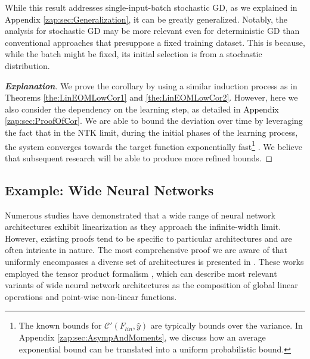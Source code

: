 \documentclass{article} %
\begin{document}
While this result addresses single-input-batch stochastic GD, as we explained in \textcolor{black}{Appendix} \ref{zap:sec:Generalization}, \textcolor{black}{it} can be greatly generalized. Notably, the analysis for stochastic GD may be more relevant even for deterministic GD than conventional approaches that presuppose a fixed training dataset. This is because, while the batch might be fixed, its initial selection is from a stochastic distribution. 

\begin{proof}[\textbf{Explanation}]
We prove the corollary by using a similar induction process as in \textcolor{black}{Theorems} \ref{the:LinEOMLowCor1}\textcolor{black}{ and} \ref{the:LinEOMLowCor2}. However, here we also consider the dependency \textcolor{black}{on} the learning step, as detailed in \textcolor{black}{Appendix} \ref{zap:sec:ProofOfCor}. We are able to bound the deviation over time by leveraging the fact that in the NTK limit, during the initial phases of the learning process, the system converges towards the target function exponentially fast\footnote{The known bounds for \(\mathcal{C}'\left(F_{lin},\hat{y}\right)\) are typically bounds over the variance. In Appendix \ref{zap:sec:AsympAndMoments}, we discuss how an average exponential bound can be translated into a uniform probabilistic bound.} \cite{ConvergenceOverparameterization2019,WideNNEvLinGD2019,GradientDescentfindsGlobal2019,AConvergenceOverPar2019,sgd2017daniely,Learningoverparameterized2018,Gradientdescentprovably2018,HowNNExtrapolate2020,LearningAndGeneralization2019}. We believe that subsequent research will be able to produce more refined bounds.
\end{proof}

\subsection{Example: Wide Neural Networks}
\label{sec:WideNNExam}

Numerous studies have demonstrated that a wide range of neural network architectures exhibit linearization as they approach the infinite-width limit. However, existing proofs tend to be specific to particular architectures and are often intricate in nature. The most comprehensive proof we are aware of that uniformly encompasses a diverse set of architectures is presented in
\cite{TensorProgramsiib2021,TensorProgramsii2020}. These works employed the tensor product formalism \cite{TensorPrograms2019}, which can describe most relevant variants of wide neural network architectures as the composition of global linear operations and point-wise non-linear functions. 
\end{document}

